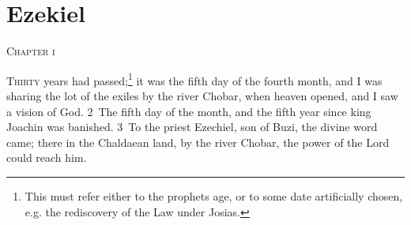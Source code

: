 \documentclass[10pt]{book} %
\begin{document}
\chapter*{Ezekiel}

\begin{large}\begin{center}\textsc{Chapter i}\end{center}\end{large}
\lettrine[lines=3]{T}{hirty} years had passed;\footnote[1]{This must refer either to the prophet\textquotesingle s age, or to some date artificially chosen, e.g. the rediscovery of the Law under Josias.} it was the fifth day of the fourth month, and I was sharing the lot of the exiles by the river Chobar, when heaven opened, and I saw a vision of God. \textcolor{benred8}{2}~The fifth day of the month, and the fifth year since king Joachin was banished. \textcolor{benred8}{3}~To the priest Ezechiel, son of Buzi, the divine word came; there in the Chaldaean land, by the river Chobar, the power of the Lord could reach him.
\end{document}
